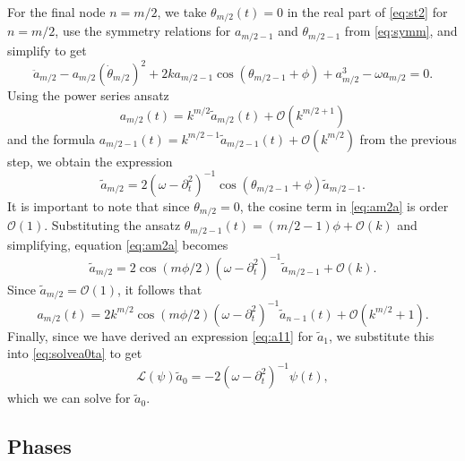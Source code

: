 \documentclass[11pt,reqno]{amsart}
\def\calL{{\mathcal L}}
\begin{document}
For the final node $n=m/2$, we take $\theta_{m/2}(t) = 0$ in the real part of \cref{eq:st2} for $n = m/2$, use the symmetry relations for $a_{m/2-1}$ and $\theta_{m/2-1}$ from \cref{eq:symm}, and simplify to get
\[
\ddot a_{m/2} - a_{m/2} (\dot \theta_{m/2})^2 + 
2 k a_{m/2-1}\cos( \theta_{m/2-1} + \phi) + a_{m/2}^3 - \omega a_{m/2} = 0.
\]
Using the power series ansatz
\[
a_{m/2}(t) = k^{m/2} \tilde{a}_{m/2}(t) + \mathcal{O}(k^{m/2+1})
\]
and the formula $a_{m/2-1}(t) = k^{m/2-1} \tilde{a}_{m/2-1}(t) + \mathcal{O}(k^{m/2})$ from the previous step, we obtain the expression
\begin{equation}\label{eq:am2a}
\tilde{a}_{m/2} = 2 (\omega - \partial_t^2)^{-1}\cos( \theta_{m/2-1} + \phi) \tilde{a}_{m/2-1}.
\end{equation}
It is important to note that since $\theta_{m/2} = 0$, the cosine term in \cref{eq:am2a} is order $\mathcal{O}(1)$. Substituting the ansatz $\theta_{m/2-1}(t) = (m/2-1)\phi + \mathcal{O}(k)$ and simplifying, equation \cref{eq:am2a} becomes
\begin{equation}\label{eq:am2}
\tilde{a}_{m/2} = 2 \cos( m\phi/2)(\omega - \partial_t^2)^{-1} \tilde{a}_{m/2-1} + \mathcal{O}(k).
\end{equation}
Since $\tilde{a}_{m/2} = \mathcal{O}(1)$, it follows that
\begin{equation}\label{eq:am2eq}
a_{m/2}(t) = 2 k^{m/2} \cos\left( m \phi / 2\right) (\omega - \partial_t^2)^{-1} \tilde{a}_{n-1}(t) + \mathcal{O}(k^{m/2}+1).
\end{equation}
Finally, since we have derived an expression \cref{eq:a11} for $\tilde{a}_1$, we substitute this into \cref{eq:solvea0ta} to get 
\[
\calL(\psi) \tilde{a}_0 = -2 (\omega - \partial_t^2)^{-1} \psi(t),
\]
which we can solve for $\tilde{a}_0$.

\subsection{Phases}
\end{document}
